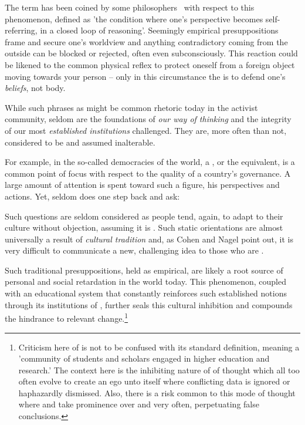 \documentclass[10pt, a4paper, cleardoubleempty, openright, twoside]{book}
\begin{document}
The term  has been coined by some
philosophers~\cite[ch.~1]{McMurtry::99} with respect to this phenomenon,
defined as 'the condition where one's perspective becomes
self-referring, in a closed loop of reasoning'. Seemingly empirical
presuppositions frame and secure one's worldview and anything
contradictory coming from the outside can be blocked or rejected, often
even subconsciously. This reaction could be likened to the common
physical reflex to protect oneself from a foreign object moving towards
your person -- only in this circumstance the  is to
defend one's \emph{beliefs}, not body.

While such phrases as  might be
common rhetoric today in the activist community, seldom are the
foundations of \emph{our way of thinking} and the integrity of our most
\emph{established institutions} challenged. They are, more often than
not, considered to be  and assumed inalterable.

For example, in the so-called democracies of the world, a
, or the equivalent, is a common point of focus
with respect to the quality of a country's governance. A large amount of
attention is spent toward such a figure, his perspectives and actions.
Yet, seldom does one step back and ask:   

Such questions are seldom considered as people tend, again, to adapt to
their culture without objection, assuming it is .  Such static orientations are almost universally a result of
\emph{cultural tradition} and, as Cohen and Nagel point out, it is very
difficult to communicate a new, challenging idea to those who are
.

Such traditional presuppositions, held as empirical, are likely a root source of personal and social retardation in the world today. This phenomenon, coupled with an educational system that constantly reinforces such established notions through its institutions of , further seals this cultural inhibition and compounds the
hindrance to relevant change.\footnote{
	Criticism here of  is not to be confused with its
	standard definition, meaning a 'community of students and scholars
	engaged in higher education and research.' The context here is the
	inhibiting nature of  of thought which all too
	often evolve to create an ego unto itself where conflicting data is
	ignored or haphazardly dismissed. Also, there is a risk common to this
	mode of thought where  and 
	take prominence over  and 
	very often, perpetuating false conclusions.
}
\end{document}
